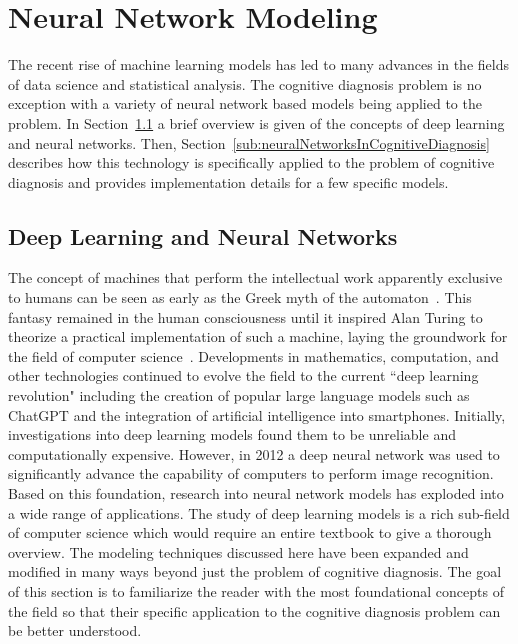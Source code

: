 \documentclass[letterpaper, 12pt, captions=tableabove]{scrreprt}
\begin{document}
	\section{Neural Network Modeling}
	\label{sec:neuralNetworkModeling}
		The recent rise of machine learning models has led to many advances in the fields of data science and statistical analysis. The cognitive diagnosis problem is no exception with a variety of neural network based models being applied to the problem. In Section~\ref{sub:neuralNetworks} a brief overview is given of the concepts of deep learning and neural networks. Then, Section~\ref{sub:neuralNetworksInCognitiveDiagnosis} describes how this technology is specifically applied to the problem of cognitive diagnosis and provides implementation details for a few specific models.

		\subsection{Deep Learning and Neural Networks}
		\label{sub:neuralNetworks}
			The concept of machines that perform the intellectual work apparently exclusive to humans can be seen as early as the Greek myth of the automaton~\cite{murray1963}. This fantasy remained in the human consciousness until it inspired Alan Turing to theorize a practical implementation of such a machine, laying the groundwork for the field of computer science~\cite{hodges1983}. Developments in mathematics, computation, and other technologies continued to evolve the field to the current ``deep learning revolution" including the creation of popular large language models such as ChatGPT and the integration of artificial intelligence into smartphones. Initially, investigations into deep learning models found them to be unreliable and computationally expensive. However, in 2012 a deep neural network was used to significantly advance the capability of computers to perform image recognition\cite{murphy2022}. Based on this foundation, research into neural network models has exploded into a wide range of applications. The study of deep learning models is a rich sub-field of computer science which would require an entire textbook to give a thorough overview. The modeling techniques discussed here have been expanded and modified in many ways beyond just the problem of cognitive diagnosis. The goal of this section is to familiarize the reader with the most foundational concepts of the field so that their specific application to the cognitive diagnosis problem can be better understood.
	
\end{document}
